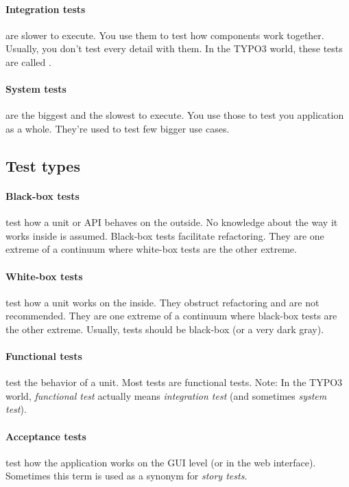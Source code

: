 \documentclass[a4paper,10pt,headsepline]{scrartcl}
\begin{document}
\paragraph{Integration tests} are slower to execute. You use them to test how components work together. Usually, you don't test every detail with them. In the TYPO3 world, these tests are called .

\paragraph{System tests} are the biggest and the slowest to execute. You use those to test you application as a whole. They're used to test few bigger use cases.


\subsection{Test types}

\paragraph{Black-box tests} test how a unit or API behaves on the outside. No knowledge about the way it works inside is assumed. Black-box tests facilitate refactoring. They are one extreme of a continuum where white-box tests are the other extreme.

\paragraph{White-box tests} test how a unit works on the inside. They obstruct refactoring and are not recommended. They are one extreme of a continuum where black-box tests are the other extreme. Usually, tests should be black-box (or a very dark gray).

\paragraph{Functional tests} test the behavior of a unit. Most tests are functional tests. Note: In the TYPO3 world, \emph{functional test} actually means \emph{integration test} (and sometimes \emph{system test}).

\paragraph{Acceptance tests} test how the application works on the GUI level (or in the web interface). Sometimes this term is used as a synonym for \emph{story tests}.
\end{document}
